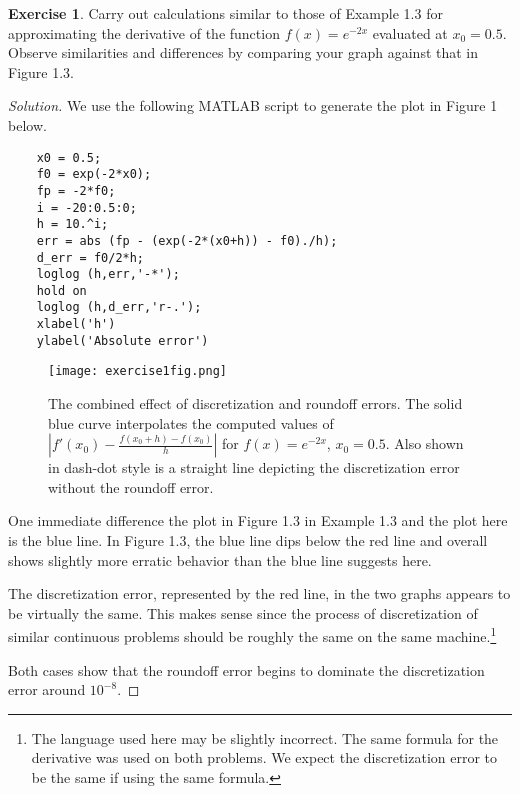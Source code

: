 \documentclass[12pt,a4]{article}
\theoremstyle{definition}
\newtheorem{exercise}{Exercise}
\begin{document}
\begin{exercise}
	Carry out calculations similar to those of Example 1.3 for approximating the derivative of the function $f(x) = e^{- 2 x}$ evaluated at $x_0 = 0.5$. Observe similarities and differences by comparing your graph against that in Figure 1.3. 
\end{exercise}
\begin{proof}[Solution]
	We use the following MATLAB script to generate the plot in Figure 1 below. 

	\begin{verbatim}
	x0 = 0.5;
	f0 = exp(-2*x0);
	fp = -2*f0;
	i = -20:0.5:0;
	h = 10.^i;
	err = abs (fp - (exp(-2*(x0+h)) - f0)./h);
	d_err = f0/2*h;
	loglog (h,err,'-*');
	hold on
	loglog (h,d_err,'r-.');
	xlabel('h')
	ylabel('Absolute error')
	\end{verbatim}
	
	\begin{figure}[h!]
		\centering
		\texttt{[image: exercise1fig.png]}
		\caption{The combined effect of discretization and roundoff errors.  The solid blue curve interpolates the computed values of $|f'(x_0) - \frac{f(x_0 + h) - f(x_0)}{h}|$ for $f(x) = e^{-2 x}$, $x_0 = 0.5$. Also shown in dash-dot style is a straight line depicting the discretization error without the roundoff error.}
	\end{figure}

	\noindent One immediate difference the plot in Figure 1.3 in Example 1.3 and the plot here is the blue line. In Figure 1.3, the blue line dips below the red line and overall shows slightly more erratic behavior than the blue line suggests here. 
	
	The discretization error, represented by the red line, in the two graphs appears to be virtually the same. This makes sense since the process of discretization of similar continuous problems should be roughly the same on the same machine.\footnote{The language used here may be slightly incorrect. The same formula for the derivative was used on both problems. We expect the discretization error to be the same if using the same formula.}
	
	Both cases show that the roundoff error begins to dominate the discretization error around $10^{-8}$. 
\end{proof}
\end{document}
